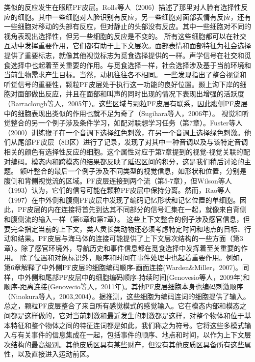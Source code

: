 类似的反应发生在眼眶PF皮层。Rolls等人（2006）描述了那里对人脸有选择性反应的细胞。其中一些细胞对人脸识别有反应，另一些细胞对面部表情有反应，还有一些细胞对移动的头部有反应，但对静止的头部没有反应。其中一些细胞对不同的视角表现出选择性，但另一些细胞的反应是不变的。
所有这些细胞都可以在社交互动中发挥重要作用，它们都有助于上下文层次。面部表情和面部特征为社会选择提供了重要标志，就像其他视觉标志为觅食选择提供的一样。声学信号在社交和觅食选择中也起着至关重要的作用。与觅食选择一样，社会选择涉及基于当前环境和当前生物需求产生目标。当然，动机往往各不相同。
一些发现指出了整合视觉和听觉信号的重要性，颗粒PF皮层处于执行这一功能的良好位置。颞上沟下岸的细胞对面部做出反应，并且在面部和叫声的同时出现的情况下表现出增强的活跃度（Barraclough等人，2005年）。这些区域与颗粒PF皮层有联系，因此腹侧PF皮层中的细胞表现出类似的作用也就不足为奇了（Sugihara等人，2006年）。
视觉和听觉整合的另一个例子涉及条件学习，如配对联想学习任务（第7章）。Fuster等人（2000）训练猴子在一个音调下选择红色刺激，在另一个音调上选择绿色刺激。他们从尾部PF皮层（8B区）进行了记录，发现了对其中一种音调以及与该特定音调相关的颜色有选择性反应的细胞。这个属性对应于第7章提到的视觉-视觉关联的配对编码。模态内和跨模态的结果都反映了延迟区间的积分，这是我们稍后讨论的主题。
额叶整合的最后一个例子涉及不同类型的视觉信息，如形状和位置，分别是腹侧和背侧视觉流的区域。PF皮层连接到两个流（第5-7章），但Wilson等人（1993）认为，它们的信号可能在颗粒PF皮层中保持分离。然而，Rao等人（1997）在中外侧和腹侧PF皮层中发现了编码记忆形状和记忆位置的单细胞。因此，PF皮层的内在连接将首先到达其不同部分的信号汇集在一起，就像来自背侧和腹侧流的输入一样（第6章和第7章）。
这些上下文整合的例子涉及感官信息，但要完全指定当前的上下文，类人灵长类动物还必须考虑特定时间和地点的目标、行动和结果。PF皮层与海马体的连接可能提供了上下文层次结构的一些方面（第3章）。除了感官环境外，导航历史和事件信息都在觅食选择中发挥着至关重要的作用。
除了位置和对象标识外，顺序和时间在事件处理中也起着重要作用。例如，第6章解释了中外侧PF皮层的细胞编码顺序-画面连接(Warden\&Miller，2007)。同样，中外侧和尾部PF皮层中的细胞编码顺序-持续时间(Genovesio等人，2009年)和顺序-距离连接(Genovecio等人，2011年)。其他PF皮层细胞本身也编码刺激顺序（Ninokura等人，2003,2004）。据推测，这些细胞为编码连词的细胞提供了输入。
总之，颗粒PF皮层整合了来自所有感觉模式的感觉输入。它在模态内部和模态之间都是这样做的，它对当前刺激和最近发生的刺激都是这样，对整个物体和位于基本特征和整个物体之间的特征连词都是如此，我们称之为符号。它将这些多模式输入与有关事件的信息集成在一起，包括事件的顺序、地点和时间，以作为上下文层次结构的最高级别。其他皮质区具有某些财产，但没有其他皮质区具备所有这些属性，以及直接进入运动前区。


